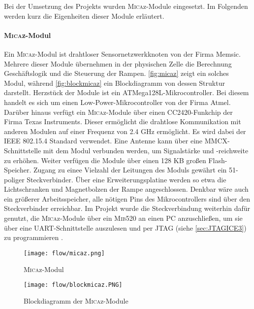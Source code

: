 Bei der Umsetzung des Projekts wurden \textsc{Mica}z-Module eingesetzt. Im Folgenden werden kurz die Eigenheiten dieser Module erläutert.

\paragraph{\textsc{Mica}z-Modul}
Ein \textsc{Mica}z-Modul ist drahtloser Sensornetzwerkknoten von der Firma Memsic. Mehrere dieser Module übernehmen in der physischen Zelle die Berechnung Geschäftslogik und die Steuerung der Rampen. \autoref{fig:micaz} zeigt ein solches Modul, während \autoref{fig:blockmicaz}  ein Blockdiagramm von dessen Struktur darstellt. Herzstück der Module ist ein ATMega128L-Mikrocontroller. Bei diesem handelt es sich um einen Low-Power-Mikrocontroller von der Firma Atmel. Darüber hinaus verfügt ein \textsc{Mica}z-Module über einen CC2420-Funkchip der Firma Texas Instruments. Dieser ermöglicht die drahtlose Kommunikation mit anderen Modulen auf einer Frequenz von 2.4 GHz ermöglicht. Es wird dabei der IEEE 802.15.4 Standard verwendet. Eine Antenne kann über eine MMCX-Schnittstelle mit dem Modul verbunden werden, um Signalstärke und -reichweite zu erhöhen. Weiter verfügen die Module über einen 128 KB großen Flash-Speicher.
Zugang zu einee Vielzahl der Leitungen des Moduls gewährt ein 51-poliger Steckverbinder. Über eine Erweiterungsplatine werden so etwa die Lichtschranken und Magnetbolzen der Rampe angeschlossen. Denkbar wäre auch ein größerer Arbeitsspeicher, alle nötigen Pins des Mikrocontrollers sind über den Steckverbinder erreichbar.
Im Projekt wurde die Steckverbindung weiterhin dafür genutzt, die \textsc{Mica}z-Module über ein \textsc{Mib}520 an einen PC anzuschließen, um sie über eine UART-Schnittstelle auszulesen und per JTAG (siehe \autoref{sec:JTAGICE3}) zu programmieren \cite{MICSHEET,C2420SHEET}.

\begin{figure}[th]
  \centering
    \texttt{[image: flow/micaz.png]}
    \caption{\textsc{Mica}z-Modul}
    \label{fig:micaz}
\end{figure}

\begin{figure}[th]
  \centering
    \texttt{[image: flow/blockmicaz.PNG]}
    \caption{Blockdiagramm der \textsc{Mica}z-Module}
    \label{fig:blockmicaz}
\end{figure}

